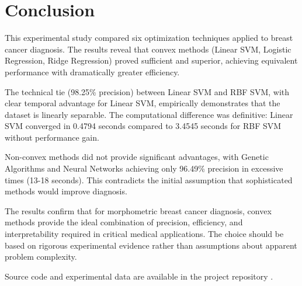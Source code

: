 \documentclass[conference]{IEEEtran}
\begin{document}
\section{Conclusion}

This experimental study compared six optimization techniques applied to breast cancer diagnosis. The results reveal that convex methods (Linear SVM, Logistic Regression, Ridge Regression) proved sufficient and superior, achieving equivalent performance with dramatically greater efficiency.

The technical tie (98.25\% precision) between Linear SVM and RBF SVM, with clear temporal advantage for Linear SVM, empirically demonstrates that the dataset is linearly separable. The computational difference was definitive: Linear SVM converged in 0.4794 seconds compared to 3.4545 seconds for RBF SVM without performance gain.

Non-convex methods did not provide significant advantages, with Genetic Algorithms and Neural Networks achieving only 96.49\% precision in excessive times (13-18 seconds). This contradicts the initial assumption that sophisticated methods would improve diagnosis.

The results confirm that for morphometric breast cancer diagnosis, convex methods provide the ideal combination of precision, efficiency, and interpretability required in critical medical applications. The choice should be based on rigorous experimental evidence rather than assumptions about apparent problem complexity.

Source code and experimental data are available in the project repository \cite{repositorio2024}.
\end{document}
